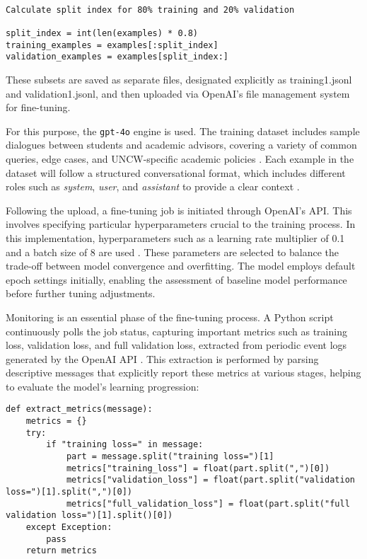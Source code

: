 \documentclass[12pt,oneside,openany]{report}
\begin{document}
\begin{verbatim}

Calculate split index for 80% training and 20% validation

split_index = int(len(examples) * 0.8)
training_examples = examples[:split_index]
validation_examples = examples[split_index:]
\end{verbatim}

These subsets are saved as separate files, designated explicitly as training1.jsonl and validation1.jsonl, and then uploaded via OpenAI's file management system for fine-tuning.

For this purpose, the \texttt{gpt-4o} engine is used. The training dataset includes sample dialogues between students and academic advisors, covering a variety of common queries, edge cases, and UNCW-specific academic policies \cite{openai_finetuning_guide}. Each example in the dataset will follow a structured conversational format, which includes different roles such as \textit{system}, \textit{user}, and \textit{assistant} to provide a clear context \cite{openai_finetuning_guide}.

Following the upload, a fine-tuning job is initiated through OpenAI’s API. This involves specifying particular hyperparameters crucial to the training process. In this implementation, hyperparameters such as a learning rate multiplier of 0.1 and a batch size of 8 are used \cite{openai_finetuning_guide}. These parameters are  selected to balance the trade-off between model convergence and overfitting. The model employs default epoch settings initially, enabling the assessment of baseline model performance before further tuning adjustments.

Monitoring is an essential phase of the fine-tuning process. A Python script continuously polls the job status, capturing important metrics such as training loss, validation loss, and full validation loss, extracted from periodic event logs generated by the OpenAI API \cite{openai_finetuning_guide}. This extraction is performed by parsing descriptive messages that explicitly report these metrics at various stages, helping to evaluate the model’s learning progression:

\begin{verbatim}
def extract_metrics(message):
    metrics = {}
    try:
        if "training loss=" in message:
            part = message.split("training loss=")[1]
            metrics["training_loss"] = float(part.split(",")[0])
            metrics["validation_loss"] = float(part.split("validation loss=")[1].split(",")[0])
            metrics["full_validation_loss"] = float(part.split("full validation loss=")[1].split()[0])
    except Exception:
        pass
    return metrics
\end{verbatim}
\end{document}
